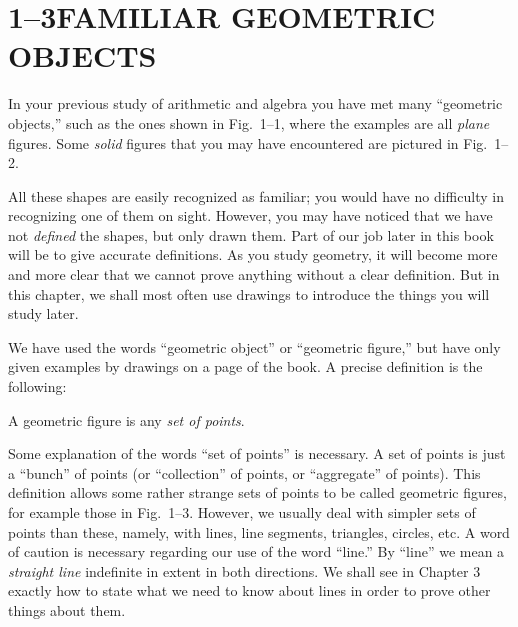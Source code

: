 \documentclass[11pt]{book}
\begin{document}
\section*{1--3\quad FAMILIAR GEOMETRIC OBJECTS}

In your previous study of arithmetic and algebra you have met many ``geometric
objects,'' such as the ones shown in Fig.~1--1, where the examples are all
\emph{plane} figures. Some \emph{solid} figures that you may have encountered are
pictured in Fig.~1--2.

\FIGIONE

\FIGITWO

All these shapes are easily recognized as familiar; you would have no difficulty
in recognizing one of them on sight. However, you may have noticed that we have
not \emph{defined} the shapes, but only drawn them. Part of our job later in this
book will be to give accurate definitions. As you study geometry, it will become
more and more clear that we cannot prove anything without a clear definition. But
in this chapter, we shall most often use drawings to introduce the things you
will study later.

We have used the words ``geometric object'' or ``geometric figure,'' but have
only given examples by drawings on a page of the book. A precise definition is
the following:

\begin{definition}
A geometric figure is any \emph{set of points}.
\end{definition}

Some explanation of the words ``set of points'' is necessary. A set of points is
just a ``bunch'' of points (or ``collection'' of points, or ``aggregate'' of
points). This definition allows some rather strange sets of points to be called
geometric figures, for example those in Fig.~1--3. However, we usually deal with
simpler sets of points than these, namely, with lines, line segments, triangles,
circles, etc. A word of caution is necessary regarding our use of the word
``line.'' By ``line'' we mean a \emph{straight line} indefinite in extent in both
directions. We shall see in Chapter 3 exactly how to state what we need to know
about lines in order to prove other things about them.

\FIGITHREE
\end{document}
